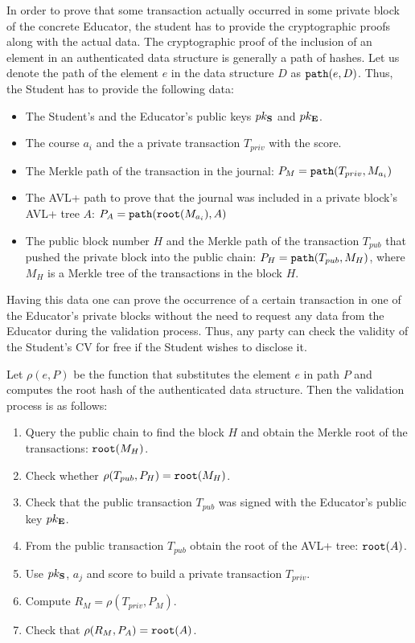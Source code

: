 In order to prove that some transaction actually occurred in some private block of the concrete Educator, the student has to provide the cryptographic proofs along with the actual data. The cryptographic proof of the inclusion of an element in an authenticated data structure is generally a path of hashes. Let us denote the path of the element $e$ in the data structure $D$ as $\mathtt{path}(e, D)$. Thus, the Student has to  provide the following data:
\begin{itemize}
  \item The Student's and the Educator's public keys $pk_{\mathbf{S}}$ and $pk_{\mathbf{E}}$.
  \item The course $a_i$ and the a private transaction $T_{priv}$ with the score.
  \item The Merkle path of the transaction in the journal: $P_{M} = \mathtt{path}(T_{priv}, M_{a_i})$
  \item The AVL+ path to prove that the journal was included in a private block's AVL+ tree $A$: $P_{A} = \mathtt{path}(\mathtt{root}(M_{a_i}), A)$
  \item The public block number $H$ and the Merkle path of the transaction $T_{pub}$ that pushed the private block into the public chain: $P_{H} = \mathtt{path}(T_{pub}, M_H)$, where $M_H$ is a Merkle tree of the transactions in the block $H$.
\end{itemize}

Having this data one can prove the occurrence of a certain transaction in one of the Educator's private blocks without the need to request any data from the Educator during the validation process. Thus, any party can check the validity of the Student's CV for free if the Student wishes to disclose it.

Let $\rho(e, P)$ be the function that substitutes the element $e$ in path $P$ and computes the root hash of the authenticated data structure. Then the validation process is as follows:
\begin{enumerate}
\item Query the public chain to find the block $H$ and obtain the Merkle root of the transactions: $\mathtt{root}(M_H)$.
\item Check whether $\rho(T_{pub}, P_{H}) = \mathtt{root}(M_H)$.
\item Check that the public transaction $T_{pub}$ was signed with the Educator's public key $pk_{\mathbf{E}}$.
\item From the public transaction $T_{pub}$ obtain the root of the AVL+ tree: $\mathtt{root}(A)$.
\item Use $pk_{\mathbf{S}}$, $a_j$ and score to build a private transaction $T_{priv}$.
\item Compute $R_{M} = \rho(T_{priv}, P_{M})$.
\item Check that $\rho(R_{M}, P_{A}) = \mathtt{root}(A)$.
\end{enumerate}

